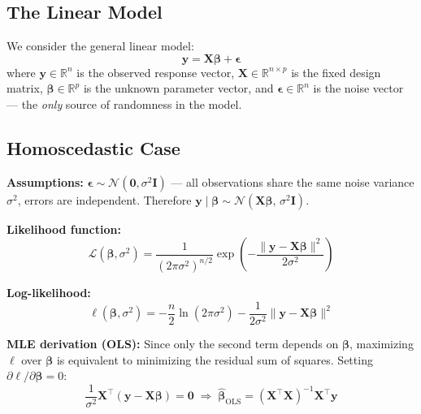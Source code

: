 \documentclass[12pt,a4paper]{article}
\begin{document}
\subsection{The Linear Model}

We consider the general linear model:
\begin{equation}
    \mathbf{y} = \mathbf{X}\boldsymbol{\beta} + \boldsymbol{\epsilon}
\end{equation}
where $\mathbf{y} \in \mathbb{R}^n$ is the observed response vector,
$\mathbf{X} \in \mathbb{R}^{n \times p}$ is the fixed design matrix,
$\boldsymbol{\beta} \in \mathbb{R}^p$ is the unknown parameter vector, and
$\boldsymbol{\epsilon} \in \mathbb{R}^n$ is the noise vector --- the \emph{only} source
of randomness in the model.

\subsection{Homoscedastic Case}

\textbf{Assumptions:}
$\boldsymbol{\epsilon} \sim \mathcal{N}(\mathbf{0}, \sigma^2\mathbf{I})$ ---
all observations share the same noise variance $\sigma^2$, errors are
independent. Therefore $\mathbf{y} \mid \boldsymbol{\beta} \sim \mathcal{N}(\mathbf{X}\boldsymbol{\beta},\, \sigma^2\mathbf{I})$.

\textbf{Likelihood function:}
\begin{equation}
    \mathcal{L}(\boldsymbol{\beta}, \sigma^2) =
    \frac{1}{(2\pi\sigma^2)^{n/2}}
    \exp\!\left(-\frac{\|\mathbf{y} - \mathbf{X}\boldsymbol{\beta}\|^2}{2\sigma^2}\right)
\end{equation}

\textbf{Log-likelihood:}
\begin{equation}
    \ell(\boldsymbol{\beta}, \sigma^2)
    = -\frac{n}{2}\ln(2\pi\sigma^2)
      - \frac{1}{2\sigma^2}\|\mathbf{y} - \mathbf{X}\boldsymbol{\beta}\|^2
\end{equation}

\textbf{MLE derivation (OLS):}
Since only the second term depends on $\boldsymbol{\beta}$, maximizing $\ell$ over
$\boldsymbol{\beta}$ is equivalent to minimizing the residual sum of squares.
Setting $\partial\ell/\partial\boldsymbol{\beta} = 0$:
\begin{equation}
    \frac{1}{\sigma^2}\mathbf{X}^\top(\mathbf{y} - \mathbf{X}\boldsymbol{\beta}) = \mathbf{0}
    \;\Rightarrow\;
    \boxed{\hat{\boldsymbol{\beta}}_{\mathrm{OLS}} = (\mathbf{X}^\top\mathbf{X})^{-1}\mathbf{X}^\top\mathbf{y}}
\end{equation}
\end{document}
